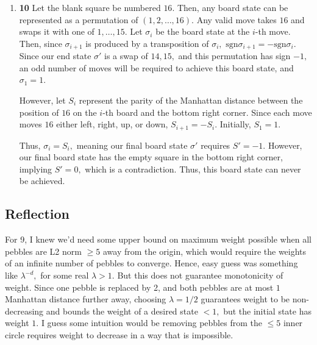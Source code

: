 \documentclass[12pt]{article}
\begin{document}
\begin{enumerate}
  \item \textbf{10} Let the blank square be numbered $16.$ Then, any
    board state can be represented as a permutation of $(1, 2,
    \ldots, 16).$ Any valid move takes $16$ and swaps it with one of
    $1, \ldots, 15.$ Let $\sigma_{i}$ be the board state at the
    $i$-th move. Then, since $\sigma_{i + 1}$ is produced by a
    transposition of $\sigma_{i},$ $\text{sgn} \sigma_{i + 1} = -
    \text{sgn} \sigma_{i}.$ Since our end state $\sigma'$ is a swap
    of $14, 15,$ and this permutation has sign $-1,$ an odd number of
    moves will be required to achieve this board state, and $\sigma_1 = 1.$

    However, let $S_i$ represent the parity of the Manhattan distance
    between the position of $16$ on the $i$-th board and the bottom
    right corner. Since each move moves $16$ either left, right, up,
    or down, $S_{i + 1} = -S_i$. Initially, $S_1 = 1.$

    Thus, $\sigma_i = S_i,$ meaning our final board state $\sigma'$
    requires $S' = -1.$ However, our final board state has the empty
    square in the bottom right corner, implying $S' = 0,$ which is a
    contradiction. Thus, this board state can never be achieved.
\end{enumerate}

\subsection{Reflection}
For 9, I knew we'd need some upper bound on maximum weight possible
when all pebbles are L2 norm $\geq 5$ away from the origin, which
would require the weights of an infinite number of pebbles to
converge. Hence, easy guess was something like $\lambda^{-d},$ for
some real $\lambda > 1.$ But this does not guarantee monotonicity of
weight. Since one pebble is replaced by 2, and both pebbles are at
most $1$ Manhattan distance further away, choosing $\lambda = 1/2$
guarantees weight to be non-decreasing and bounds the weight of a
desired state $< 1,$ but the initial state has weight $1.$ I guess
some intuition would be removing pebbles from the $\leq 5$ inner
circle requires weight to decrease in a way that is impossible.
\end{document}
